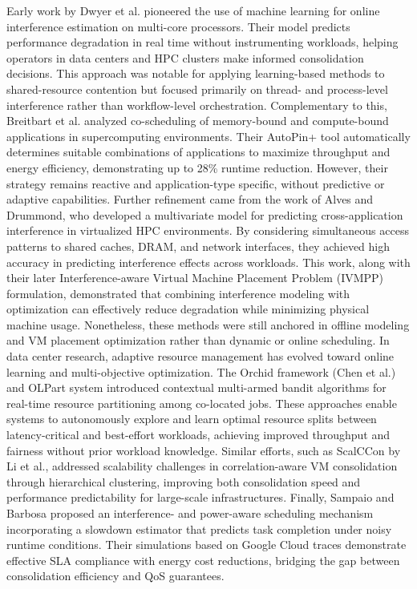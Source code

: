 Early work by Dwyer et al. pioneered the use of machine learning for online interference estimation on multi-core processors. Their model predicts performance degradation in real time without instrumenting workloads, helping operators in data centers and HPC clusters make informed consolidation decisions. This approach was notable for applying learning-based methods to shared-resource contention but focused primarily on thread- and process-level interference rather than workflow-level orchestration. Complementary to this, Breitbart et al. analyzed co-scheduling of memory-bound and compute-bound applications in supercomputing environments. Their AutoPin+ tool automatically determines suitable combinations of applications to maximize throughput and energy efficiency, demonstrating up to 28\% runtime reduction. However, their strategy remains reactive and application-type specific, without predictive or adaptive capabilities.
Further refinement came from the work of Alves and Drummond, who developed a multivariate model for predicting cross-application interference in virtualized HPC environments. By considering simultaneous access patterns to shared caches, DRAM, and network interfaces, they achieved high accuracy in predicting interference effects across workloads. This work, along with their later Interference-aware Virtual Machine Placement Problem (IVMPP) formulation, demonstrated that combining interference modeling with optimization can effectively reduce degradation while minimizing physical machine usage. Nonetheless, these methods were still anchored in offline modeling and VM placement optimization rather than dynamic or online scheduling.
In data center research, adaptive resource management has evolved toward online learning and multi-objective optimization. The Orchid framework (Chen et al.) and OLPart system introduced contextual multi-armed bandit algorithms for real-time resource partitioning among co-located jobs. These approaches enable systems to autonomously explore and learn optimal resource splits between latency-critical and best-effort workloads, achieving improved throughput and fairness without prior workload knowledge. Similar efforts, such as ScalCCon by Li et al., addressed scalability challenges in correlation-aware VM consolidation through hierarchical clustering, improving both consolidation speed and performance predictability for large-scale infrastructures.
Finally, Sampaio and Barbosa proposed an interference- and power-aware scheduling mechanism incorporating a slowdown estimator that predicts task completion under noisy runtime conditions. Their simulations based on Google Cloud traces demonstrate effective SLA compliance with energy cost reductions, bridging the gap between consolidation efficiency and QoS guarantees.


